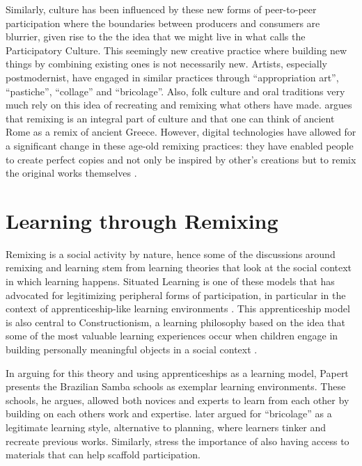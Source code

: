 Similarly, culture has been influenced by these new forms of peer-to-peer participation where the boundaries between producers and consumers are blurrier, given rise to the the idea that we might live in what \citet{jenkins_convergence_2009} calls the Participatory Culture.
This seemingly new creative practice where building new things by combining existing ones is not necessarily new. 
Artists, especially postmodernist, have engaged in similar practices through ``appropriation art'', ``pastiche'', ``collage'' and ``bricolage''. 
Also, folk culture and oral traditions very much rely on this idea of recreating and remixing what others have made. %
\citet{manovich_remix_2005} argues that remixing is an integral part of culture and that one can think of ancient Rome as a remix of ancient Greece.
However, digital technologies have allowed for a  significant change in these age-old remixing practices: they have enabled people to create perfect copies and not only be inspired by other's creations but to remix the original works themselves \citep{sinnreich_ethics_2009}.

\section{Learning through Remixing}
Remixing is a social activity by nature, hence some of the discussions around remixing and learning stem from learning theories that look at the social context in which learning happens.
Situated Learning is one of these models that has advocated for legitimizing peripheral forms of participation, in particular in the context of apprenticeship-like learning environments \citep{lave_situated_1991}. 
This apprenticeship model is also central to Constructionism, a learning philosophy based on the idea that some of the most valuable learning experiences occur when children engage in building personally meaningful objects in a social context \citet{papert}. 

In arguing for this theory and using apprenticeships as a learning model, Papert presents the Brazilian Samba schools as exemplar learning environments. These schools, he argues, allowed both novices and experts to learn from each other by building on each others work and expertise. 
\citet{papert_turkle} later argued for ``bricolage'' as a legitimate learning style, alternative to planning, where learners tinker and recreate previous works.
Similarly,  \citet{wenger} stress the importance of also having access to materials that can help scaffold participation.

